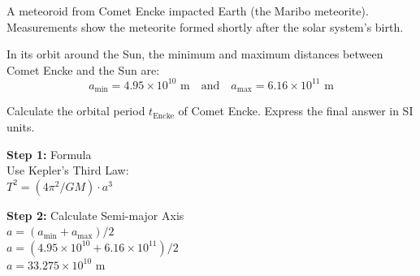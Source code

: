 \begin{minipage}{\linewidth}
\begin{tcolorbox}[
    title={\textbf{IPhO 2013 Q1}},
    colback=white,
    colframe=gray!50!black,
    arc=3pt,
    boxrule=1pt,
    fonttitle=\sffamily\large,
    width=\linewidth
]

    \begin{tcolorbox}[
        colback=gray!5,
        colframe=gray!20,
        coltitle=black,
        title={\small \textbf{QUESTION}},
        fontupper=\small\sffamily,
        boxrule=0.5pt,
        sharp corners,
        left=3pt, right=3pt, top=3pt, bottom=3pt
    ]
        A meteoroid from Comet Encke impacted Earth (the Maribo meteorite). Measurements show the meteorite formed shortly after the solar system's birth.
        \vspace{0.5em}
        
        In its orbit around the Sun, the minimum and maximum distances between Comet Encke and the Sun are:
        \[ a_{\min} = 4.95 \times 10^{10} \text{ m} \quad \text{and} \quad a_{\max} = 6.16 \times 10^{11} \text{ m} \]
        
        Calculate the orbital period $t_{\text{Encke}}$ of Comet Encke. Express the final answer in SI units.
    \end{tcolorbox}

    \vspace{0.5em}

    \noindent
    \begin{minipage}[t]{0.49\linewidth}
        \vspace{0pt}
        \begin{tcolorbox}[
            title={\small \textbf{BASE MODEL}},
            colframe=blue!60!white,
            colback=blue!5!white,
            coltitle=white,
            fontupper=\small\ttfamily\raggedright,
            boxrule=0.5pt,
            sharp corners,
            left=2pt, right=2pt,
            width=\linewidth,
            nobeforeafter
        ]
            \textbf{\textcolor{blue!60!black}{Step 1:}} Formula\\
            Use Kepler's Third Law:\\
            $T^2 = (4\pi^2 / GM) \cdot a^3$
            \vspace{1em}
            
            \textbf{\textcolor{blue!60!black}{Step 2:}} Calculate Semi-major Axis\\
            $a = (a_{\min} + a_{\max}) / 2$\\
            $a = (4.95 \times 10^{10} + 6.16 \times 10^{11}) / 2$\\
            $a = 33.275 \times 10^{10}\text{ m}$
            \vspace{1em}
            

\end{tcolorbox}
\end{minipage}
\end{tcolorbox}
\end{minipage}
